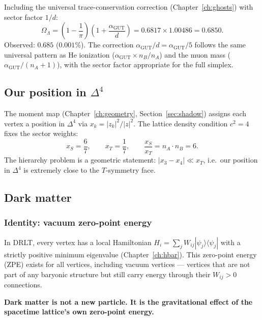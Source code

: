 \documentclass[12pt]{article}
\theoremstyle{remark}
\theoremstyle{definition}
\begin{document}
Including the universal trace-conservation correction (Chapter~\ref{ch:ghosts}) with sector factor $1/d$:
\begin{equation}
\boxed{\Omega_\Lambda = \left(1 - \frac{1}{\pi}\right)\!\left(1 + \frac{\alpha_\mathrm{GUT}}{d}\right) = 0.6817 \times 1.00486 = 0.6850.}
\end{equation}
Observed: $0.685$ ($0.001\%$).  The correction $\alpha_\mathrm{GUT}/d = \alpha_\mathrm{GUT}/5$ follows the same universal pattern as He ionization ($\alpha_\mathrm{GUT} \times n_B/n_A$) and the muon mass ($\alpha_\mathrm{GUT}/(n_A+1)$), with the sector factor appropriate for the full simplex.

\subsection{Our position in $\Delta^4$}
\label{sec:our_position}

The moment map (Chapter~\ref{ch:geometry}, Section~\ref{sec:shadow}) assigns each vertex a position in $\Delta^4$ via $x_k = |z_k|^2/|z|^2$.  The lattice density condition $c^2 = 4$ fixes the sector weights:
\begin{equation}
x_S = \frac{6}{7}, \qquad x_T = \frac{1}{7}, \qquad \frac{x_S}{x_T} = n_A \cdot n_B = 6.
\end{equation}
The hierarchy problem is a geometric statement: $|x_3 - x_4| \ll x_T$, i.e.\ our position in $\Delta^4$ is extremely close to the $T$-symmetry face.

\subsection{Dark matter}

\subsubsection{Identity: vacuum zero-point energy}

In DRLT, every vertex has a local Hamiltonian $H_i = \sum_j W_{ij}|\psi_j\rangle\langle\psi_j|$ with a strictly positive minimum eigenvalue (Chapter~\ref{ch:hbar}). This zero-point energy (ZPE) exists for all vertices, including vacuum vertices --- vertices that are not part of any baryonic structure but still carry energy through their $W_{ij} > 0$ connections.

\textbf{Dark matter is not a new particle. It is the gravitational effect of the spacetime lattice's own zero-point energy.}
\end{document}
